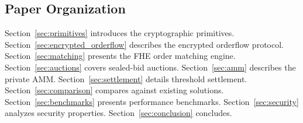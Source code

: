 \subsection{Paper Organization}

Section~\ref{sec:primitives} introduces the cryptographic primitives. Section~\ref{sec:encrypted_orderflow} describes the encrypted orderflow protocol. Section~\ref{sec:matching} presents the FHE order matching engine. Section~\ref{sec:auctions} covers sealed-bid auctions. Section~\ref{sec:amm} describes the private AMM. Section~\ref{sec:settlement} details threshold settlement. Section~\ref{sec:comparison} compares against existing solutions. Section~\ref{sec:benchmarks} presents performance benchmarks. Section~\ref{sec:security} analyzes security properties. Section~\ref{sec:conclusion} concludes.

